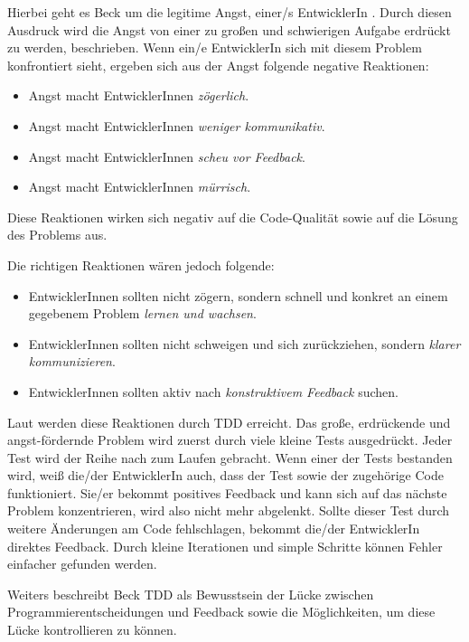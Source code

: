 Hierbei geht es Beck um die legitime Angst, einer/s EntwicklerIn  \autocite[xi]{Beck:2003}. Durch diesen Ausdruck wird die Angst von einer zu großen und schwierigen Aufgabe erdrückt zu werden, beschrieben. Wenn ein/e EntwicklerIn sich mit diesem Problem konfrontiert sieht, ergeben sich aus der Angst folgende negative Reaktionen:
\begin{itemize}
  \item Angst macht EntwicklerInnen \textit{zögerlich}.
  \item Angst macht EntwicklerInnen \textit{weniger kommunikativ}.
  \item Angst macht EntwicklerInnen \textit{scheu vor Feedback}.
  \item Angst macht EntwicklerInnen \textit{mürrisch}.
\end{itemize}
Diese Reaktionen wirken sich negativ auf die Code-Qualität sowie auf die Lösung des Problems aus.

Die richtigen Reaktionen wären jedoch folgende:
\begin{itemize}
  \item EntwicklerInnen sollten nicht zögern, sondern schnell und konkret an einem gegebenem Problem \textit{lernen und wachsen}.
  \item EntwicklerInnen sollten nicht schweigen und sich zurückziehen, sondern \textit{klarer kommunizieren}.
  \item EntwicklerInnen sollten aktiv nach \textit{konstruktivem Feedback} suchen.
\end{itemize}

Laut \cite{Beck:2003} werden diese Reaktionen durch TDD erreicht. Das große, erdrückende und angst-fördernde Problem wird zuerst durch viele kleine Tests ausgedrückt. Jeder Test wird der Reihe nach zum Laufen gebracht. Wenn einer der Tests bestanden wird, weiß die/der EntwicklerIn auch, dass der Test sowie der zugehörige Code funktioniert. Sie/er bekommt positives Feedback und kann sich auf das nächste Problem konzentrieren, wird also nicht mehr abgelenkt. Sollte dieser Test durch weitere Änderungen am Code fehlschlagen, bekommt die/der EntwicklerIn direktes Feedback. Durch kleine Iterationen und simple Schritte können Fehler einfacher gefunden werden.

Weiters beschreibt Beck TDD als Bewusstsein der Lücke zwischen Programmierentscheidungen und Feedback sowie die Möglichkeiten, um diese Lücke kontrollieren zu können.

